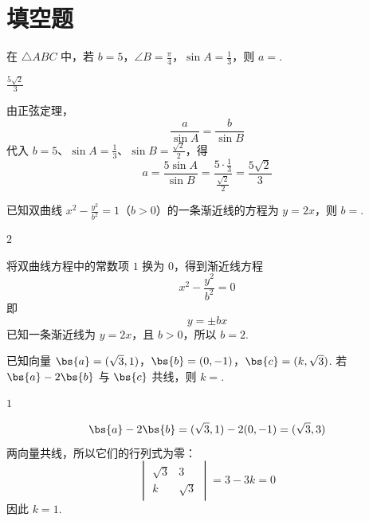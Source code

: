 \section{填空题}

\begin{problem}
在 \(\triangle ABC\) 中，若 \(b = 5\)，\(\angle B = \frac{\pi}{4}\)，\(\sin A = \frac{1}{3}\)，则 \(a =\)\fillinblank{}.
\end{problem}

\begin{answer}
\(\frac{5\sqrt{2}}{3}\)
\end{answer}

\begin{solution}
由正弦定理，
\[
\frac{a}{\sin A}=\frac{b}{\sin B}
\]
代入 \(b=5\)、\(\sin A=\frac{1}{3}\)、\(\sin B=\frac{\sqrt{2}}{2}\)，得
\[
a=\frac{5\sin A}{\sin B}
=\frac{5\cdot\frac{1}{3}}{\frac{\sqrt{2}}{2}}
=\frac{5\sqrt{2}}{3}
\]
\end{solution}

\begin{problem}
已知双曲线 \(x^{2}-\frac{y^{2}}{b^{2}}=1\)（\(b>0\)）的一条渐近线的方程为 \(y = 2x\)，则 \(b=\)\fillinblank{}.
\end{problem}

\begin{answer}
\(2\)
\end{answer}

\begin{solution}
将双曲线方程中的常数项 \(1\) 换为 \(0\)，得到渐近线方程
\[
x^{2}-\frac{y^{2}}{b^{2}}=0
\]
即
\[
y=\pm bx
\]
已知一条渐近线为 \(y=2x\)，且 \(b>0\)，所以 \(b=2\).
\end{solution}

\begin{problem}
已知向量 \(\bs{a} = (\sqrt{3}, 1)\)，\(\bs{b} = (0, -1)\)，\(\bs{c} = (k, \sqrt{3})\). 若 \(\bs{a} - 2\bs{b}\) 与 \(\bs{c}\) 共线，则 \(k =\)\fillinblank{}.
\end{problem}

\begin{answer}
\(1\)
\end{answer}

\begin{solution}
\[
\bs{a}-2\bs{b}=(\sqrt{3},1)-2(0,-1)=(\sqrt{3},3)
\]
两向量共线，所以它们的行列式为零：
\[
\begin{vmatrix}
\sqrt{3} & 3\\
k & \sqrt{3}
\end{vmatrix}
=3-3k=0
\]
因此 \(k=1\).
\end{solution}

